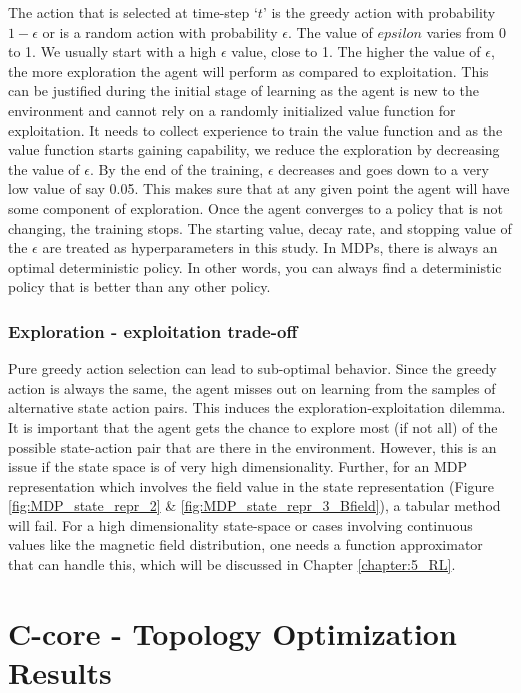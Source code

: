 The action that is selected at time-step `$t$' is the greedy action with probability $1 - \epsilon$ or is a random action with probability $\epsilon$.
The value of $epsilon$ varies from 0 to 1. We usually start with a high $\epsilon$ value, close to 1. The higher the value of $\epsilon$, the more exploration the agent will perform as compared to exploitation. This can be justified during the initial stage of learning as the agent is new to the environment and cannot rely on a randomly initialized value function for exploitation. It needs to collect experience to train the value function and as the value function starts gaining capability, we reduce the exploration by decreasing the value of $\epsilon$. By the end of the training, $\epsilon$ decreases and goes down to a very low value of say 0.05. This makes sure that at any given point the agent will have some component of exploration. Once the agent converges to a policy that is not changing, the training stops. The starting value, decay rate, and stopping value of the $\epsilon$ are treated as hyperparameters in this study. In MDPs, there is always an optimal deterministic policy. In other words, you can always find a deterministic policy that is better than any other policy.

\subsubsection{Exploration - exploitation trade-off}
Pure greedy action selection can lead to sub-optimal behavior. Since the greedy action is always the same, the agent misses out on learning from the samples of alternative state action pairs. This induces the exploration-exploitation dilemma. It is important that the agent gets the chance to explore most (if not all) of the possible state-action pair that are there in the environment. However, this is an issue if the state space is of very high dimensionality. Further, for an MDP representation which involves the field value in the state representation (Figure \ref{fig:MDP_state_repr_2} \& \ref{fig:MDP_state_repr_3_Bfield}), a tabular method will fail. For a high dimensionality state-space or cases involving continuous values like the magnetic field distribution, one needs a function approximator that can handle this, which will be discussed in Chapter \ref{chapter:5_RL}.

\section{C-core - Topology Optimization Results} \label{sec:MDP_C_core_Topology_Optimization_Results}

